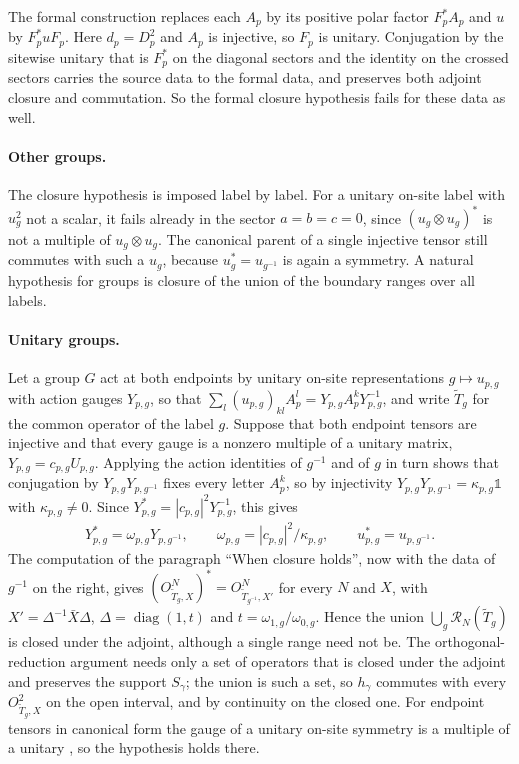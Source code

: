 \documentclass{article}
\begin{document}
The formal construction replaces each $A_p$ by its positive polar factor
$F_p^*A_p$ and $u$ by $F_p^*uF_p$. Here $d_p=D_p^2$ and $A_p$ is
injective, so $F_p$ is unitary. Conjugation by the sitewise unitary that
is $F_p^*$ on the diagonal sectors and the identity on the crossed sectors
carries the source data to the formal data, and preserves both adjoint
closure and commutation. So the formal closure hypothesis fails for these
data as well.

\paragraph{Other groups.} The closure hypothesis is imposed label by
label. For a unitary on-site label with $u_g^2$ not a scalar, it fails
already in the sector $a=b=c=0$, since $(u_g\otimes u_g)^*$ is not a
multiple of $u_g\otimes u_g$. The canonical parent of a single injective
tensor still commutes with such a $u_g$, because $u_g^*=u_{g^{-1}}$ is
again a symmetry. A natural hypothesis for groups is closure of the
union of the boundary ranges over all labels.

\paragraph{Unitary groups.} Let a group $G$ act at both endpoints by
unitary on-site representations $g\mapsto u_{p,g}$ with action gauges
$Y_{p,g}$, so that $\sum_l(u_{p,g})_{kl}A_p^l=Y_{p,g}A_p^kY_{p,g}^{-1}$,
and write $\widetilde T_g$ for the common operator of the label $g$.
Suppose that both endpoint tensors are injective and that every gauge is
a nonzero multiple of a unitary matrix, $Y_{p,g}=c_{p,g}U_{p,g}$.
Applying the action identities of $g^{-1}$ and of $g$ in turn shows that
conjugation by $Y_{p,g}Y_{p,g^{-1}}$ fixes every letter $A_p^k$, so by
injectivity $Y_{p,g}Y_{p,g^{-1}}=\kappa_{p,g}\mathbb 1$ with
$\kappa_{p,g}\neq0$. Since $Y_{p,g}^*=|c_{p,g}|^2Y_{p,g}^{-1}$, this
gives
\begin{align}
    Y_{p,g}^*=\omega_{p,g}Y_{p,g^{-1}},\qquad
    \omega_{p,g}=|c_{p,g}|^2/\kappa_{p,g},\qquad
    u_{p,g}^*=u_{p,g^{-1}} .
    \label{eq:glm23_parent_commutation_group_gauge_adjoint}
\end{align}
The computation of the paragraph ``When closure holds'', now with the
data of $g^{-1}$ on the right, gives
$(O^N_{\widetilde T_g,X})^*=O^N_{\widetilde T_{g^{-1}},X'}$ for every
$N$ and $X$, with $X'=\Delta^{-1}\bar X\Delta$,
$\Delta=\operatorname{diag}(1,t)$ and $t=\omega_{1,g}/\omega_{0,g}$.
Hence the union $\bigcup_g\mathcal R_N(\widetilde T_g)$ is closed under
the adjoint, although a single range need not be. The
orthogonal-reduction argument needs only a set of operators that is
closed under the adjoint and preserves the support $S_\gamma$; the union
is such a set, so $h_\gamma$ commutes with every $O^2_{\widetilde T_g,X}$
on the open interval, and by continuity on the closed one. For endpoint
tensors in canonical form the gauge of a unitary on-site symmetry is a
multiple of a unitary \cite[Lemma~1 and
    Theorem~2]{PerezGarcia2008StringOrder}, so the hypothesis holds there.
\end{document}
